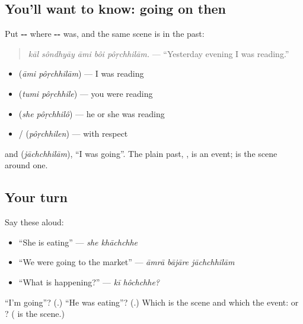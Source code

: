 \subsection*{You'll want to know: going on then}
Put \textbf{--} where \textbf{--} was, and the same scene is in the past:

\begin{quote}
\textbf{    }
\end{quote}

\begin{quote}
\emph{kāl sôndhyāy āmi bôi pôṛchhilām.} — \textquotedblleft{}Yesterday evening I was reading.\textquotedblright{}
\end{quote}

\begin{itemize}
\raggedright
  \item \textbf{ } (\emph{āmi pôṛchhilām}) — I was reading
  \item \textbf{ } (\emph{tumi pôṛchhile}) — you were reading
  \item \textbf{ } (\emph{she pôṛchhilô}) — he or she was reading
  \item \textbf{} / \textbf{} \textbf{} (\emph{pôṛchhilen}) — with respect
\end{itemize}

and \textbf{} (\emph{jāchchhilām}), \textquotedblleft{}I was going\textquotedblright{}. The plain past, \textbf{}, is an event; \textbf{} is the scene around one.

\subsection*{Your turn}
Say these aloud:

\begin{itemize}
\raggedright
  \item \textquotedblleft{}She is eating\textquotedblright{} — \emph{she khāchchhe}
  \item \textquotedblleft{}We were going to the market\textquotedblright{} — \emph{āmrā bājāre jāchchhilām}
  \item \textquotedblleft{}What is happening?\textquotedblright{} — \emph{kī hôchchhe?}
\end{itemize}

\begin{tcolorbox}[breakable,colback=teal!4,colframe=teal!35!black,title={Before you move on}]
\textquotedblleft{}I'm going\textquotedblright{}? (\textbf{}.) \textquotedblleft{}He was eating\textquotedblright{}? (\textbf{}.) Which is the scene and which the event: \textbf{} or \textbf{}? (\textbf{} is the scene.)
\end{tcolorbox}
